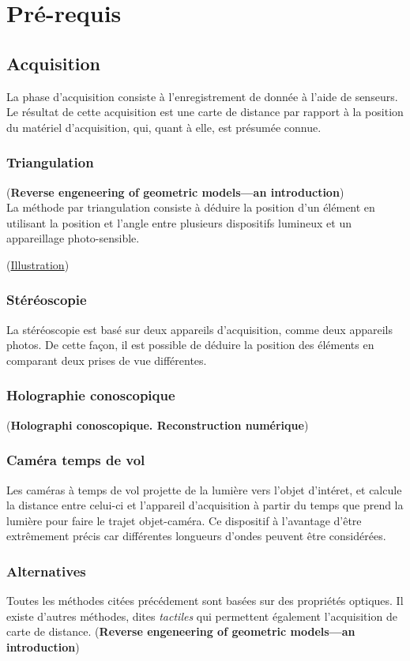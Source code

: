 \chapter{Pré-requis}
\section{Acquisition \label{acquisition}}
La phase d'acquisition consiste à l'enregistrement de donnée à l'aide de senseurs. Le résultat de cette acquisition est une carte de distance par rapport à la position du matériel d'acquisition, qui, quant à elle, est présumée connue.
\subsection{Triangulation}
(\textbf{Reverse engeneering of geometric models—an introduction})\\

La méthode par triangulation consiste à déduire la position d'un élément en utilisant la position et l'angle entre plusieurs dispositifs lumineux et un appareillage photo-sensible.

(\underline{Illustration})

\subsection{Stéréoscopie}
La stéréoscopie est basé sur deux appareils d'acquisition, comme deux appareils photos. De cette façon, il est possible de déduire la position des éléments en comparant deux prises de vue différentes.

\subsection{Holographie conoscopique}
(\textbf{Holographi conoscopique. Reconstruction numérique})

\subsection{Caméra temps de vol}
Les caméras à temps de vol projette de la lumière vers l'objet d'intéret, et calcule la distance entre celui-ci et l'appareil d'acquisition à partir du temps que prend la lumière pour faire le trajet objet-caméra. Ce dispositif à l'avantage d'être extrêmement précis car différentes longueurs d'ondes peuvent être considérées.

\subsection{Alternatives}
Toutes les méthodes citées précédement sont basées sur des propriétés optiques. Il existe d'autres méthodes, dites \emph{tactiles} qui permettent également l'acquisition de carte de distance. (\textbf{Reverse engeneering of geometric models—an introduction})

